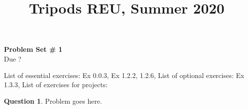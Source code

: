 \documentclass[11pt]{article}
\title{\vspace{-100pt} Tripods REU, Summer 2020}
\author{}
\date{}
\theoremstyle{quest}
\theoremstyle{plain}
\theoremstyle{definition}
\newtheorem{question}{Question}
\newcommand{\solution}[1]{}
\begin{document}
\maketitle
\vspace{-60pt}
\begin{center}
{\Large \bf Problem Set \# 1}\\\vspace{5pt}
{Due ?}
\end{center}

List of essential exercises: Ex 0.0.3, Ex 1.2.2, 1.2.6,
List of optional exercises: Ex 1.3.3,
List of exercises for projects:

\begin{question}
Problem goes here.

\solution{
Solution here.
}
\end{question}
\end{document}
